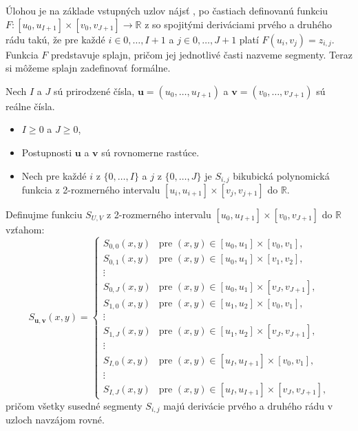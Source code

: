 \documentclass{rnthesis}
\newcommand{\real}{$\mathbb{R}$}
\begin{document}
Úlohou je na základe vstupných uzlov nájsť , po častiach definovanú funkciu $F: [u_0, u_{I+1}] \times [v_0, v_{J+1}] \to \mathbb{R}$ z so spojitými deriváciami prvého a druhého rádu takú, že pre každé $i \in  {0, \dots, I+1}$ a $j \in  {0, \dots, J+1}$ platí $F(u_i, v_j) = z_{i,j}$. Funkcia $F$ predstavuje splajn, pričom jej jednotlivé časti nazveme segmenty. 
Teraz si môžeme splajn zadefinovať formálne.

\begin{df}
	Nech $I$ a $J$ sú prirodzené čísla, $\mathbf{u} = (u_0, \dots,u_{I+1})$ a $\mathbf{v} = (v_0, \dots,v_{J+1})$ sú reálne čísla.
	\begin{itemize}
		\item
		$I \ge 0$ a $J \ge 0$,
		\item 
		Postupnosti $\mathbf{u}$ a $\mathbf{v}$ sú rovnomerne rastúce.
		\item
		Nech pre každé $i$ z $\{0, \dots, I\}$ a $j$ z $\{0, \dots, J\}$ je $S_{i,j}$ bikubická polynomická funkcia z  2-rozmerného intervalu $[u_{i}, u_{i+1}] \times [v_{j}, v_{j+1}]$ do \real.
	\end{itemize}
	Definujme funkciu $S_{U,V}$ z 2-rozmerného intervalu $[u_{0}, u_{I+1}] \times [v_{0}, v_{J+1}]$ do $\mathbb{R}$ vzťahom:
	\begin{equation}
	S_{\mathbf{u},\mathbf{v}}(x,y) = \begin{cases}
	S_{0,0}(x,y) & \text{pre } (x, y) \in [u_{0}, u_{1}] \times [v_{0}, v_{1}] \text{,}\\
	S_{0,1}(x,y) & \text{pre } (x, y) \in [u_{0}, u_{1}] \times [v_{1}, v_{2}] \text{,}\\
	\vdots\\
	S_{0,J}(x,y) & \text{pre } (x, y) \in [u_{0}, u_{1}] \times [v_{J}, v_{J+1}] \text{,}\\
	S_{1,0}(x,y) & \text{pre } (x, y) \in [u_{1}, u_{2}] \times [v_{0}, v_{1}] \text{,}\\
	\vdots\\
	S_{1,J}(x,y) & \text{pre } (x, y) \in [u_{1}, u_{2}] \times [v_{J}, v_{J+1}] \text{,}\\
	\vdots\\
	S_{I,0}(x,y) & \text{pre } (x, y) \in [u_{I}, u_{I+1}] \times [v_{0}, v_{1}] \text{,}\\
	\vdots\\
	S_{I,J}(x,y) & \text{pre } (x, y) \in [u_{I}, u_{I+1}] \times [v_{J}, v_{J+1}] \text{,}
	\end{cases}
	\end{equation}
	pričom všetky susedné segmenty $S_{i,j}$ majú derivácie prvého a druhého rádu v uzloch navzájom rovné.
\end{df}
\end{document}
